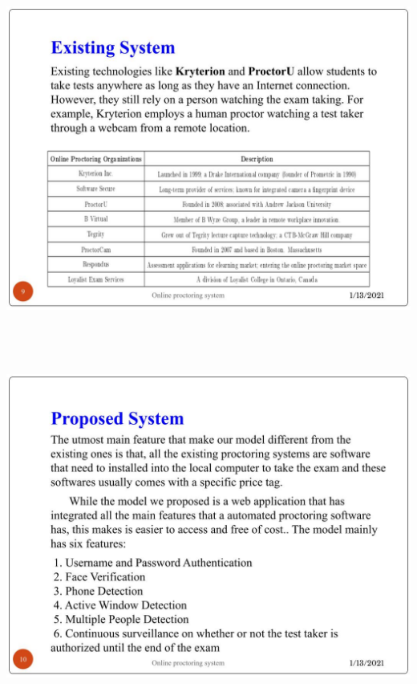 \documentclass[12pt]{report}
\begin{document}
\includegraphics[width=17cm,height=12cm]{INTERNSHIP SAMPLE PRESENTATION (8)}\\
\includegraphics[width=17cm,height=12cm]{INTERNSHIP SAMPLE PRESENTATION (9)}\\
\end{document}
